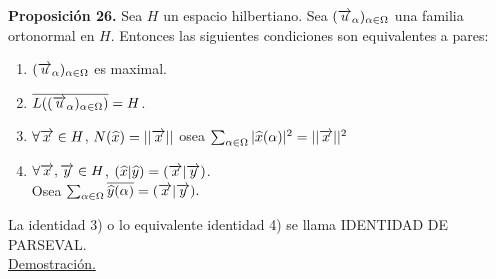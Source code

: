 \textbf{Proposición 26.}
Sea $H$ un espacio hilbertiano. Sea $(\overrightarrow{u}_\alpha)_{\alpha \in \Omega}$ una familia ortonormal en $H$. Entonces las siguientes condiciones son equivalentes a pares:
\begin{enumerate}[1)]

\item  $(\overrightarrow{u}_\alpha)_{\alpha \in \Omega}$ es maximal.
\item $\overline{L ( (\overrightarrow{u}_\alpha)_{\alpha \in \Omega})}=H$.
\item $\forall \overrightarrow{x} \in H$, $N(\widehat{x})= || \overrightarrow{x} ||$ osea $\sum_{\alpha \in \Omega}| \widehat{x}(\alpha)|^2=|| \overrightarrow{x} ||^2$
\item $\forall \overrightarrow{x},\overrightarrow{y} \in H$, $(\widehat{x} | \widehat{y})=(\overrightarrow{x} | \overrightarrow{y})$. \\
Osea $\sum_{\alpha \in \Omega} \overline{\widehat{y}(\alpha)}=(\overrightarrow{x} | \overrightarrow{y}).$

\end{enumerate}
La identidad 3) o lo equivalente identidad 4) se llama IDENTIDAD DE PARSEVAL. \\
\underline{Demostración.}
